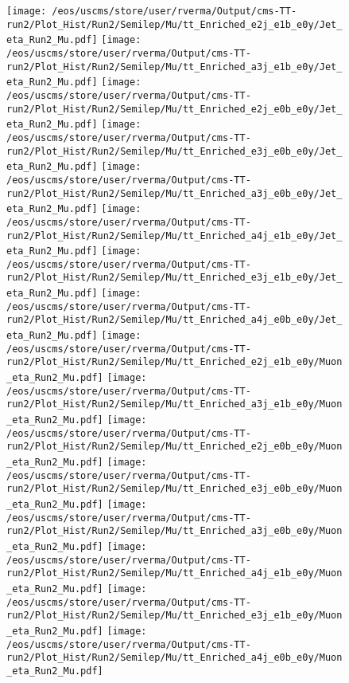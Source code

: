 \begin{figure}
\centering
\texttt{[image: /eos/uscms/store/user/rverma/Output/cms-TT-run2/Plot\_Hist/Run2/Semilep/Mu/tt\_Enriched\_e2j\_e1b\_e0y/Jet\_eta\_Run2\_Mu.pdf]}
\texttt{[image: /eos/uscms/store/user/rverma/Output/cms-TT-run2/Plot\_Hist/Run2/Semilep/Mu/tt\_Enriched\_a3j\_e1b\_e0y/Jet\_eta\_Run2\_Mu.pdf]}
\texttt{[image: /eos/uscms/store/user/rverma/Output/cms-TT-run2/Plot\_Hist/Run2/Semilep/Mu/tt\_Enriched\_e2j\_e0b\_e0y/Jet\_eta\_Run2\_Mu.pdf]}
\texttt{[image: /eos/uscms/store/user/rverma/Output/cms-TT-run2/Plot\_Hist/Run2/Semilep/Mu/tt\_Enriched\_e3j\_e0b\_e0y/Jet\_eta\_Run2\_Mu.pdf]}
\texttt{[image: /eos/uscms/store/user/rverma/Output/cms-TT-run2/Plot\_Hist/Run2/Semilep/Mu/tt\_Enriched\_a3j\_e0b\_e0y/Jet\_eta\_Run2\_Mu.pdf]}
\texttt{[image: /eos/uscms/store/user/rverma/Output/cms-TT-run2/Plot\_Hist/Run2/Semilep/Mu/tt\_Enriched\_a4j\_e1b\_e0y/Jet\_eta\_Run2\_Mu.pdf]}
\texttt{[image: /eos/uscms/store/user/rverma/Output/cms-TT-run2/Plot\_Hist/Run2/Semilep/Mu/tt\_Enriched\_e3j\_e1b\_e0y/Jet\_eta\_Run2\_Mu.pdf]}
\texttt{[image: /eos/uscms/store/user/rverma/Output/cms-TT-run2/Plot\_Hist/Run2/Semilep/Mu/tt\_Enriched\_a4j\_e0b\_e0y/Jet\_eta\_Run2\_Mu.pdf]}
\texttt{[image: /eos/uscms/store/user/rverma/Output/cms-TT-run2/Plot\_Hist/Run2/Semilep/Mu/tt\_Enriched\_e2j\_e1b\_e0y/Muon\_eta\_Run2\_Mu.pdf]}
\texttt{[image: /eos/uscms/store/user/rverma/Output/cms-TT-run2/Plot\_Hist/Run2/Semilep/Mu/tt\_Enriched\_a3j\_e1b\_e0y/Muon\_eta\_Run2\_Mu.pdf]}
\texttt{[image: /eos/uscms/store/user/rverma/Output/cms-TT-run2/Plot\_Hist/Run2/Semilep/Mu/tt\_Enriched\_e2j\_e0b\_e0y/Muon\_eta\_Run2\_Mu.pdf]}
\texttt{[image: /eos/uscms/store/user/rverma/Output/cms-TT-run2/Plot\_Hist/Run2/Semilep/Mu/tt\_Enriched\_e3j\_e0b\_e0y/Muon\_eta\_Run2\_Mu.pdf]}
\texttt{[image: /eos/uscms/store/user/rverma/Output/cms-TT-run2/Plot\_Hist/Run2/Semilep/Mu/tt\_Enriched\_a3j\_e0b\_e0y/Muon\_eta\_Run2\_Mu.pdf]}
\texttt{[image: /eos/uscms/store/user/rverma/Output/cms-TT-run2/Plot\_Hist/Run2/Semilep/Mu/tt\_Enriched\_a4j\_e1b\_e0y/Muon\_eta\_Run2\_Mu.pdf]}
\texttt{[image: /eos/uscms/store/user/rverma/Output/cms-TT-run2/Plot\_Hist/Run2/Semilep/Mu/tt\_Enriched\_e3j\_e1b\_e0y/Muon\_eta\_Run2\_Mu.pdf]}
\texttt{[image: /eos/uscms/store/user/rverma/Output/cms-TT-run2/Plot\_Hist/Run2/Semilep/Mu/tt\_Enriched\_a4j\_e0b\_e0y/Muon\_eta\_Run2\_Mu.pdf]}
\end{figure}

